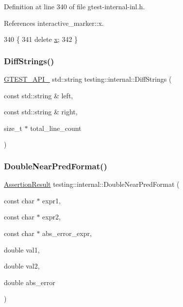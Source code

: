 Definition at line 340 of file gtest-\/internal-\/inl.\+h.



References interactive\+\_\+marker\+::x.


\begin{DoxyCode}
340                          \{
341   \textcolor{keyword}{delete} \hyperlink{namespaceinteractive__marker_acda52804aef30b460a72fb21ee01d69d}{x};
342 \}
\end{DoxyCode}
\mbox{\label{namespacetesting_1_1internal_a513107ff8defa97d949937fc1350a56c}} 
\subsubsection{\texorpdfstring{Diff\+Strings()}{DiffStrings()}}
{\footnotesize\ttfamily \hyperlink{gtest-port_8h_aa73be6f0ba4a7456180a94904ce17790}{G\+T\+E\+S\+T\+\_\+\+A\+P\+I\+\_\+} std\+::string testing\+::internal\+::\+Diff\+Strings (\begin{DoxyParamCaption}\item[{const std\+::string \&}]{left,  }\item[{const std\+::string \&}]{right,  }\item[{size\+\_\+t $\ast$}]{total\+\_\+line\+\_\+count }\end{DoxyParamCaption})}

\mbox{\label{namespacetesting_1_1internal_a4f70b36c624b54c2362aeecc2f05ee8c}} 
\subsubsection{\texorpdfstring{Double\+Near\+Pred\+Format()}{DoubleNearPredFormat()}}
{\footnotesize\ttfamily \hyperlink{classtesting_1_1AssertionResult}{Assertion\+Result} testing\+::internal\+::\+Double\+Near\+Pred\+Format (\begin{DoxyParamCaption}\item[{const char $\ast$}]{expr1,  }\item[{const char $\ast$}]{expr2,  }\item[{const char $\ast$}]{abs\+\_\+error\+\_\+expr,  }\item[{double}]{val1,  }\item[{double}]{val2,  }\item[{double}]{abs\+\_\+error }\end{DoxyParamCaption})}



